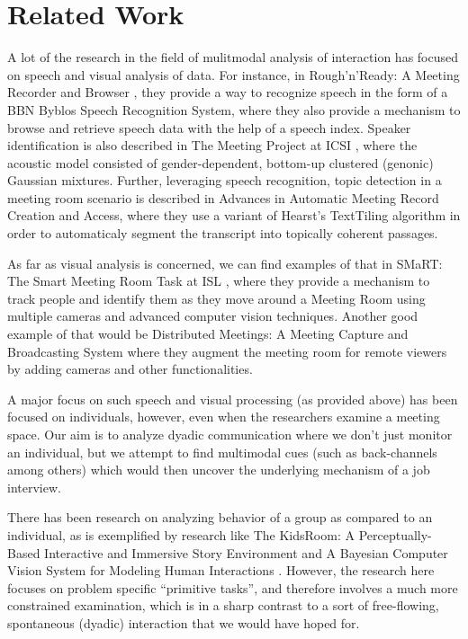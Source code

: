 \section{Related Work}
A lot of the research in the field of mulitmodal analysis of interaction has focused on speech and visual analysis of data. For instance, in Rough’n’Ready: A Meeting Recorder and Browser \cite{kubala1999rough}, they provide a way to recognize speech in the form of a BBN Byblos Speech Recognition System, where they also provide a mechanism to browse and retrieve speech data with the help of a speech index. Speaker identification is also described in The Meeting Project at ICSI \cite{morgan2001meeting}, where the acoustic model consisted of gender-dependent, bottom-up clustered (genonic) Gaussian mixtures. Further, leveraging speech recognition, topic detection in a meeting room scenario is described in Advances in Automatic Meeting Record Creation and Access, where they use a variant of Hearst’s TextTiling algorithm in order to automaticaly segment the transcript into topically coherent passages.

As far as visual analysis is concerned, we can find examples of that in SMaRT: The Smart Meeting Room Task at ISL \cite{waibel2003smart}, where they provide a mechanism to track people and identify them as they move around a Meeting Room using multiple cameras and advanced computer vision techniques. Another good example of that would be Distributed Meetings: A Meeting Capture and Broadcasting System \cite{cutler2002distributed} where they augment the meeting room for remote viewers by adding cameras and other functionalities.

A major focus on such speech and visual processing (as provided above) has been focused on individuals, however, even when the researchers examine a meeting space. Our aim is to analyze dyadic communication where we don’t just monitor an individual, but we attempt to find multimodal cues (such as back-channels among others) which would then uncover the underlying mechanism of a job interview.

There has been research on analyzing behavior of a group as compared to an individual, as is exemplified by research like The KidsRoom: A Perceptually-Based Interactive \cite{bobick1999kidsroom} and Immersive Story Environment and A Bayesian Computer Vision System for Modeling Human Interactions \cite{oliver2000bayesian}. However, the research here focuses on problem specific “primitive tasks”, and therefore involves a much more constrained examination, which is in a sharp contrast to a sort of free-flowing, spontaneous (dyadic) interaction that we would have hoped for.

